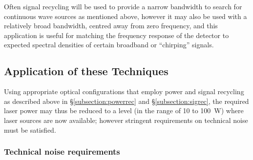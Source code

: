 \documentclass{article}
\begin{document}
Often signal recycling will be used to provide a narrow bandwidth to search for
continuous wave sources as mentioned above, however it may also be used with a
relatively broad bandwidth, centred away from zero frequency, and this
application is useful for matching the frequency response of the detector to
expected spectral densities of certain broadband or ``chirping'' signals.


\subsection{Application of these Techniques}
\label{subsection:application}

Using appropriate optical configurations that employ power and signal recycling
as described above in \S\ref{subsection:powerrec} and \S\ref{subsection:sigrec},
the required laser power may thus be reduced to a level (in the range of 10 to
100~W) where laser sources are now available; however stringent requirements on
technical noise must be satisfied.


\subsubsection{Technical noise requirements}
\label{subsubsection:lasernoise}
\end{document}
